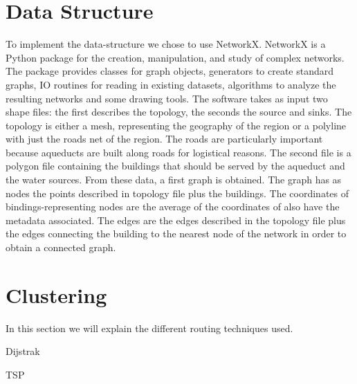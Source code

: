 \section{Data Structure}
\label{data_structure_technical}
To implement the data-structure we chose to use NetworkX. NetworkX is a Python package
for the creation, manipulation, and study of complex networks. The package provides
classes for graph objects, generators to create standard graphs, IO routines for reading in
existing datasets, algorithms to analyze the resulting networks and some drawing tools.
The software takes as input two shape files: the first describes the topology, the seconds
the source and sinks. The topology is either a mesh, representing the geography of the
region or a polyline with just the roads net of the region. The roads are particularly
important because aqueducts are built along roads for logistical reasons. The second file
is a polygon file containing the buildings that should be served by the aqueduct and the
water sources.
From these data, a first graph is obtained. The graph has as nodes the points described
in topology file plus the buildings. The coordinates of bindings-representing nodes are the
average of the coordinates of also have the metadata associated. The edges are the edges
described in the topology file plus the edges connecting the building to the nearest node
of the network in order to obtain a connected graph.

\section{Clustering} 
\label{Clustering_thecnical}

\label{Routing_thecnical}
In this section we will explain the different routing techniques used.

Dijstrak


TSP


